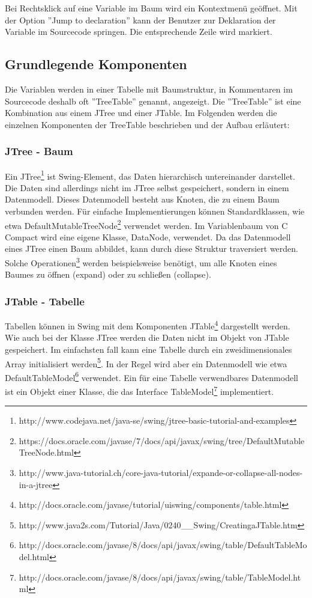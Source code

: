 Bei Rechtsklick auf eine Variable im Baum wird ein Kontextmenü geöffnet. Mit der Option ''Jump to declaration'' kann der Benutzer zur Deklaration der Variable im Sourcecode springen. Die entsprechende Zeile wird markiert.

\subsection{Grundlegende Komponenten}
Die Variablen werden in einer Tabelle mit Baumstruktur, in Kommentaren im Sourcecode deshalb oft ''TreeTable'' genannt, angezeigt. Die ''TreeTable'' ist eine Kombination aus einem JTree und einer JTable.
\newline
Im Folgenden werden die einzelnen Komponenten der TreeTable beschrieben und der Aufbau erläutert:

\subsubsection*{JTree - Baum}
Ein JTree\footnote{http://www.codejava.net/java-se/swing/jtree-basic-tutorial-and-examples} ist Swing-Element, das Daten hierarchisch untereinander darstellet. Die Daten sind allerdings nicht im JTree selbst gespeichert, sondern in einem Datenmodell. Dieses Datenmodell besteht aus Knoten, die zu einem Baum verbunden werden. Für einfache Implementierungen können Standardklassen, wie etwa DefaultMutableTreeNode\footnote{https://docs.oracle.com/javase/7/docs/api/javax/swing/tree/DefaultMutableTreeNode.html} verwendet werden. Im Variablenbaum von C Compact wird eine eigene Klasse, DataNode, verwendet. Da das Datenmodell eines JTree einen Baum abbildet, kann durch diese Struktur traversiert werden. Solche Operationen\footnote{http://www.java-tutorial.ch/core-java-tutorial/expande-or-collapse-all-nodes-in-a-jtree} werden beispielsweise benötigt, um alle Knoten eines Baumes zu öffnen (expand) oder zu schließen (collapse).


\subsubsection*{JTable - Tabelle}
Tabellen können in Swing mit dem Komponenten JTable\footnote{http://docs.oracle.com/javase/tutorial/uiswing/components/table.html} dargestellt werden. Wie auch bei der Klasse JTree werden die Daten nicht im Objekt von JTable gespeichert. Im einfachsten fall kann eine Tabelle durch ein zweidimensionales Array initialisiert werden\footnote{http://www.java2s.com/Tutorial/Java/0240\_\_Swing/CreatingaJTable.htm}. In der Regel wird aber ein Datenmodell wie etwa DefaultTableModel\footnote{http://docs.oracle.com/javase/8/docs/api/javax/swing/table/DefaultTableModel.html} verwendet. Ein für eine Tabelle verwendbares Datenmodell ist ein Objekt einer Klasse, die das Interface TableModel\footnote{http://docs.oracle.com/javase/8/docs/api/javax/swing/table/TableModel.html} implementiert.

